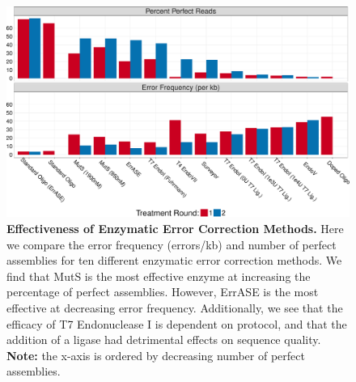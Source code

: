 \documentclass[twocolumn]{article}
\begin{document}
\clearpage
\begin{figure}[t]
\centering
\includegraphics[width=174mm]{Figure_3-1.pdf}
\caption{\small \textbf{Effectiveness of Enzymatic Error Correction Methods.} Here we compare the error frequency (errors/kb) and number of perfect assemblies for ten different enzymatic error correction methods. We find that MutS is the most effective enzyme at increasing the percentage of perfect assemblies. However, ErrASE is the most effective at decreasing error frequency. Additionally, we see that the efficacy of T7 Endonuclease I is dependent on protocol, and that the addition of a ligase had detrimental effects on sequence quality. \textbf{Note:} the x-axis is ordered by decreasing number of perfect assemblies.}
\label{fig:errorRates}
\end{figure}

\end{document}
